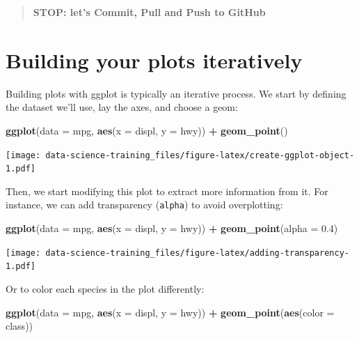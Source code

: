 \documentclass[]{book}
\newenvironment{Shaded}{\begin{snugshade}}{\end{snugshade}}
\newcommand{\KeywordTok}[1]{\textcolor[rgb]{0.13,0.29,0.53}{\textbf{#1}}}
\newcommand{\DataTypeTok}[1]{\textcolor[rgb]{0.13,0.29,0.53}{#1}}
\newcommand{\FloatTok}[1]{\textcolor[rgb]{0.00,0.00,0.81}{#1}}
\newcommand{\StringTok}[1]{\textcolor[rgb]{0.31,0.60,0.02}{#1}}
\newcommand{\OperatorTok}[1]{\textcolor[rgb]{0.81,0.36,0.00}{\textbf{#1}}}
\newcommand{\NormalTok}[1]{#1}
\theoremstyle{definition}
\theoremstyle{definition}
\theoremstyle{definition}
\theoremstyle{remark}
\begin{document}
\begin{quote}
\textbf{STOP: let's Commit, Pull and Push to GitHub}
\end{quote}

\section{Building your plots
iteratively}\label{building-your-plots-iteratively}

Building plots with ggplot is typically an iterative process. We start
by defining the dataset we'll use, lay the axes, and choose a geom:

\begin{Shaded}
\begin{Highlighting}[]
\KeywordTok{ggplot}\NormalTok{(}\DataTypeTok{data =}\NormalTok{ mpg, }\KeywordTok{aes}\NormalTok{(}\DataTypeTok{x =}\NormalTok{ displ, }\DataTypeTok{y =}\NormalTok{ hwy)) }\OperatorTok{+}
\StringTok{    }\KeywordTok{geom_point}\NormalTok{()}
\end{Highlighting}
\end{Shaded}

\texttt{[image: data-science-training\_files/figure-latex/create-ggplot-object-1.pdf]}

Then, we start modifying this plot to extract more information from it.
For instance, we can add transparency (\texttt{alpha}) to avoid
overplotting:

\begin{Shaded}
\begin{Highlighting}[]
\KeywordTok{ggplot}\NormalTok{(}\DataTypeTok{data =}\NormalTok{ mpg, }\KeywordTok{aes}\NormalTok{(}\DataTypeTok{x =}\NormalTok{ displ, }\DataTypeTok{y =}\NormalTok{ hwy)) }\OperatorTok{+}
\StringTok{    }\KeywordTok{geom_point}\NormalTok{(}\DataTypeTok{alpha =} \FloatTok{0.4}\NormalTok{)}
\end{Highlighting}
\end{Shaded}

\texttt{[image: data-science-training\_files/figure-latex/adding-transparency-1.pdf]}

Or to color each species in the plot differently:

\begin{Shaded}
\begin{Highlighting}[]
\KeywordTok{ggplot}\NormalTok{(}\DataTypeTok{data =}\NormalTok{ mpg, }\KeywordTok{aes}\NormalTok{(}\DataTypeTok{x =}\NormalTok{ displ, }\DataTypeTok{y =}\NormalTok{ hwy)) }\OperatorTok{+}
\StringTok{    }\KeywordTok{geom_point}\NormalTok{(}\KeywordTok{aes}\NormalTok{(}\DataTypeTok{color =}\NormalTok{ class))}
\end{Highlighting}
\end{Shaded}
\end{document}
